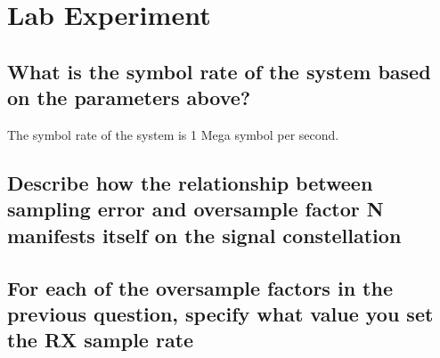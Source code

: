 \documentclass[frenchb, oneside, headings=normal]{scrartcl}
\begin{document}
\section{Lab Experiment}
\subsection{What is the symbol rate of the system based on the parameters above?}
The symbol rate of the system is 1 Mega symbol per second.
\subsection{Describe how the relationship between sampling error and oversample factor N manifests itself on the signal constellation}

\subsection{For each of the oversample factors in the previous question, specify what value you set the RX sample rate}
\end{document}

